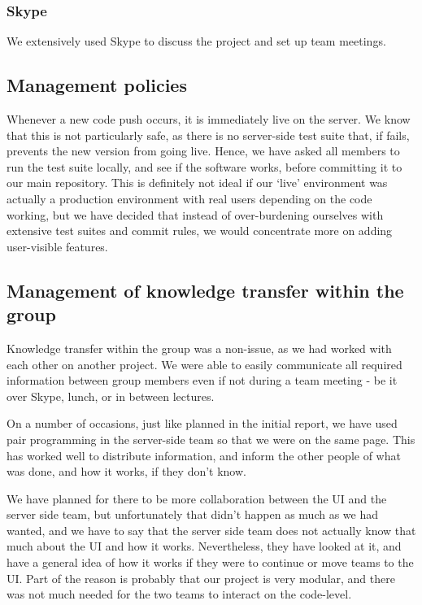 \documentclass[a4paper,12pt]{article}
\begin{document}
			\subsubsection{Skype}
			
			We extensively used Skype to discuss the project and set up team meetings.
		
		\subsection{Management policies}
		
		Whenever a new code push occurs, it is immediately live on the server. We know that this is not particularly safe, as there is no server-side test suite that, if fails, prevents the new version from going live. Hence, we have asked all members to run the test suite locally, and see if the software works, before committing it to our main repository. This is definitely not ideal if our `live' environment was actually a production environment with real users depending on the code working, but we have decided that instead of over-burdening ourselves with extensive test suites and commit rules, we would concentrate more on adding user-visible features.
		
		\subsection{Management of knowledge transfer within the group}
		
		Knowledge transfer within the group was a non-issue, as we had worked with each other on another project. We were able to easily communicate all required information between group members even if not during a team meeting - be it over Skype, lunch, or in between lectures.
		
		On a number of occasions, just like planned in the initial report, we have used pair programming in the server-side team so that we were on the same page. This has worked well to distribute information, and inform the other people of what was done, and how it works, if they don't know. 
		
		We have planned for there to be more collaboration between the UI and the server side team, but unfortunately that didn't happen as much as we had wanted, and we have to say that the server side team does not actually know that much about the UI and how it works. Nevertheless, they have looked at it, and have a general idea of how it works if they were to continue or move teams to the UI. Part of the reason is probably that our project is very modular, and there was not much needed for the two teams to interact on the code-level.
	
\end{document}
